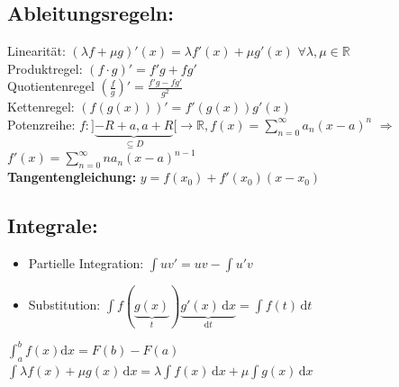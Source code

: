 \documentclass[6pt,a4paper]{scrartcl}
\newcommand{\enbrace}[1]{\ensuremath{\left(#1\right)}}
\begin{document}
\begin{multicols*}{4}
\subsection{Ableitungsregeln:}
Linearität: $(\lambda f + \mu g)' (x) = \lambda f'(x) + \mu g'(x)$ \quad $\forall \lambda, \mu \in \mathbb R$ \\
Produktregel: $(f \cdot g)' = f' g + f g'$\\
Quotientenregel $\enbrace{\frac{f}{g}}' = \frac{f'g - fg'}{g^2}$\\
Kettenregel: $\left( f(g(x)) \right)' = f'(g(x)) g'(x)$\\
Potenzreihe: $f: ] \underbrace{-R+a, a+R}_{\subseteq D}	 [ \rightarrow \mathbb R, f(x) = \sum_{n=0}^{\infty} a_n (x -a)^n$ \quad $\Rightarrow$ \quad $f'(x) = \sum_{n=0}^{\infty} n a_{n} (x-a)^{n-1}$\\
\textbf{Tangentengleichung:} $y=f(x_0)+f'(x_0)(x-x_0)$
\fi

\subsection{Integrale:}
\begin{itemize}\itemsep-1pt
\item Partielle Integration: $\int uv'=uv-\int u'v$
\item Substitution: $\int f(\underbrace {g(x)}_{t}) \underbrace {g'(x)\,\mathrm dx}_{\mathrm dt}=\int f(t)\, \mathrm dt$
\end{itemize}

$\int_a^b f(x) \mathrm dx = F(b) - F(a)$\\
$\int\lambda f(x)+\mu g(x) \, \mathrm dx=\lambda\int f(x) \, \mathrm dx + \mu\int g(x) \, \mathrm dx$


\end{multicols*}
\end{document}
